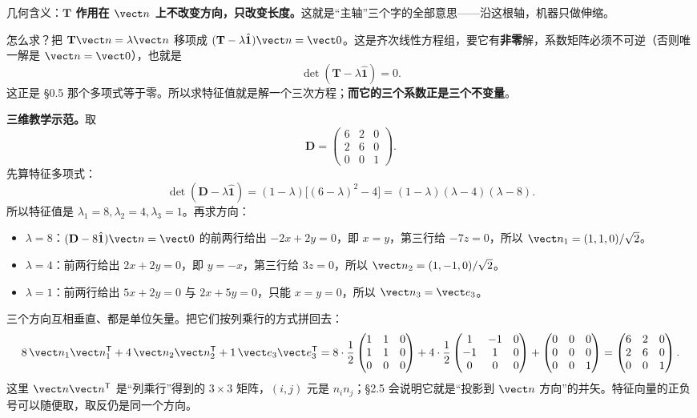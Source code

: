 \documentclass[11pt]{ctexart}
\newcommand{\ten}[1]{\mathbf{#1}}
\newcommand{\unitd}{\hat{\ten{1}}}
\begin{document}
几何含义：\textbf{$\ten T$ 作用在 $\vect n$ 上不改变方向，只改变长度。}这就是“主轴”三个字的全部意思——沿这根轴，机器只做伸缩。

怎么求？把 $\ten T\vect n=\lambda\vect n$ 移项成 $(\ten T-\lambda\unitd)\vect n=\vect0$。这是齐次线性方程组，要它有\textbf{非零}解，系数矩阵必须不可逆（否则唯一解是 $\vect n=\vect0$），也就是
\[
\det(\ten T-\lambda\unitd)=0 .
\]
这正是 §0.5 那个多项式等于零。所以求特征值就是解一个三次方程；\textbf{而它的三个系数正是三个不变量}。

\textbf{三维教学示范。}取
\[
\ten D=\begin{pmatrix}6&2&0\\2&6&0\\0&0&1\end{pmatrix}.
\]
先算特征多项式：
\[
\det(\ten D-\lambda\unitd)
=(1-\lambda)\bigl[(6-\lambda)^2-4\bigr]
=(1-\lambda)(\lambda-4)(\lambda-8).
\]
所以特征值是 $\lambda_1=8,\lambda_2=4,\lambda_3=1$。再求方向：
\begin{itemize}
\item $\lambda=8$：$(\ten D-8\unitd)\vect n=\vect0$ 的前两行给出 $-2x+2y=0$，即 $x=y$，第三行给 $-7z=0$，所以 $\vect n_1=(1,1,0)/\sqrt2$。
\item $\lambda=4$：前两行给出 $2x+2y=0$，即 $y=-x$，第三行给 $3z=0$，所以 $\vect n_2=(1,-1,0)/\sqrt2$。
\item $\lambda=1$：前两行给出 $5x+2y=0$ 与 $2x+5y=0$，只能 $x=y=0$，所以 $\vect n_3=\vect e_3$。
\end{itemize}
三个方向互相垂直、都是单位矢量。把它们按列乘行的方式拼回去：
\[
8\,\vect n_1\vect n_1^{\mathsf T}+4\,\vect n_2\vect n_2^{\mathsf T}+1\,\vect e_3\vect e_3^{\mathsf T}
=8\cdot\frac12\begin{pmatrix}1&1&0\\1&1&0\\0&0&0\end{pmatrix}
+4\cdot\frac12\begin{pmatrix}1&-1&0\\-1&1&0\\0&0&0\end{pmatrix}
+\begin{pmatrix}0&0&0\\0&0&0\\0&0&1\end{pmatrix}
=\begin{pmatrix}6&2&0\\2&6&0\\0&0&1\end{pmatrix}.
\]
这里 $\vect n\vect n^{\mathsf T}$ 是“列乘行”得到的 $3\times3$ 矩阵，$(i,j)$ 元是 $n_in_j$；§2.5 会说明它就是“投影到 $\vect n$ 方向”的并矢。特征向量的正负号可以随便取，取反仍是同一个方向。
\end{document}
